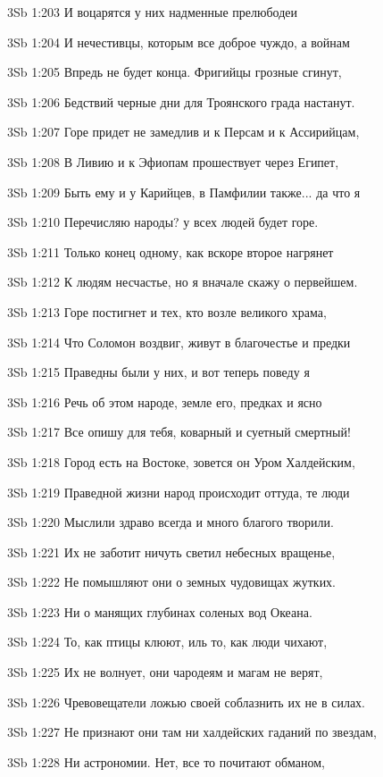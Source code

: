 \vs 3Sb 1:203 И воцарятся у них надменные прелюбодеи 

\vs 3Sb 1:204 И нечестивцы, которым все доброе чуждо, а войнам 

\vs 3Sb 1:205 Впредь не будет конца. Фригийцы грозные сгинут, 

\vs 3Sb 1:206 Бедствий черные дни для Троянского града настанут. 

\vs 3Sb 1:207 Горе придет не замедлив и к Персам и к Ассирийцам, 

\vs 3Sb 1:208 В Ливию и к Эфиопам прошествует через Египет, 

\vs 3Sb 1:209 Быть ему и у Карийцев, в Памфилии также... да что я 

\vs 3Sb 1:210 Перечисляю народы?  у всех людей будет горе. 

\vs 3Sb 1:211 Только конец одному, как вскоре второе нагрянет 

\vs 3Sb 1:212 К людям несчастье, но я вначале скажу о первейшем.

\vs 3Sb 1:213 Горе постигнет и тех, кто возле великого храма, 

\vs 3Sb 1:214 Что Соломон воздвиг, живут в благочестье  и предки 

\vs 3Sb 1:215 Праведны были у них, и вот теперь поведу я 

\vs 3Sb 1:216 Речь об этом народе, земле его, предках и ясно 

\vs 3Sb 1:217 Все опишу для тебя, коварный и суетный смертный!

\vs 3Sb 1:218 Город есть на Востоке, зовется он Уром Халдейским, 

\vs 3Sb 1:219 Праведной жизни народ происходит оттуда, те люди

\vs 3Sb 1:220 Мыслили здраво всегда и много благого творили. 

\vs 3Sb 1:221 Их не заботит ничуть светил небесных вращенье, 

\vs 3Sb 1:222 Не помышляют они о земных чудовищах жутких. 

\vs 3Sb 1:223 Ни о манящих глубинах соленых вод Океана. 

\vs 3Sb 1:224 То, как птицы клюют, иль то, как люди чихают,

\vs 3Sb 1:225 Их не волнует, они чародеям и магам не верят,

\vs 3Sb 1:226 Чревовещатели ложью своей соблазнить их не в силах. 

\vs 3Sb 1:227 Не признают они там ни халдейских гаданий по звездам, 

\vs 3Sb 1:228 Ни астрономии. Нет, все то почитают обманом, 


